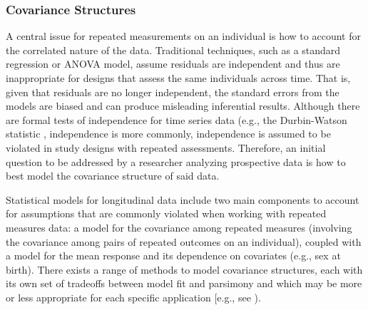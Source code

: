 \documentclass[
  number,
  preprint,
  3p,
  twocolumn]{elsarticle}
\begin{document}
\hypertarget{covariance-structures}{%
\subsubsection{Covariance Structures}\label{covariance-structures}}

A central issue for repeated measurements on an individual is how to
account for the correlated nature of the data. Traditional techniques,
such as a standard regression or ANOVA model, assume residuals are
independent and thus are inappropriate for designs that assess the same
individuals across time. That is, given that residuals are no longer
independent, the standard errors from the models are biased and can
produce misleading inferential results. Although there are formal tests
of independence for time series data (e.g., the Durbin-Watson statistic
\citep{durbin1950}, independence is more commonly, independence is
assumed to be violated in study designs with repeated assessments.
Therefore, an initial question to be addressed by a researcher analyzing
prospective data is how to best model the covariance structure of said
data.

Statistical models for longitudinal data include two main components to
account for assumptions that are commonly violated when working with
repeated measures data: a model for the covariance among repeated
measures (involving the covariance among pairs of repeated outcomes on
an individual), coupled with a model for the mean response and its
dependence on covariates (e.g., sex at birth). There exists a range of
methods to model covariance structures, each with its own set of
tradeoffs between model fit and parsimony and which may be more or less
appropriate for each specific application {[}e.g., see
\citep{kincaid2005}).
\end{document}
